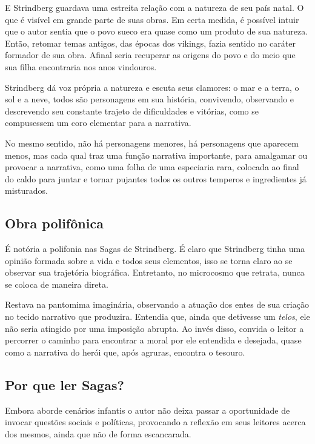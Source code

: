 \documentclass{extarticle}
\begin{document}
E Strindberg guardava uma estreita relação com a natureza de seu país
natal. O que é visível em grande parte de suas obras. Em certa medida, é
possível intuir que o autor sentia que o povo sueco era quase como um
produto de sua natureza. Então, retomar temas antigos, das épocas dos
vikings, fazia sentido no caráter formador de sua obra. Afinal seria
recuperar as origens do povo e do meio que sua filha encontraria nos
anos vindouros.

Strindberg dá voz própria a natureza e escuta seus clamores: o mar e a
terra, o sol e a neve, todos são personagens em sua história,
convivendo, observando e descrevendo seu constante trajeto de
dificuldades e vitórias, como se compusessem um coro elementar para a
narrativa.

No mesmo sentido, não há personagens menores, há personagens que
aparecem menos, mas cada qual traz uma função narrativa importante, para
amalgamar ou provocar a narrativa, como uma folha de uma especiaria
rara, colocada ao final do caldo para juntar e tornar pujantes todos os
outros temperos e ingredientes já misturados.

\subsection{Obra polifônica}

É notória a polifonia nas Sagas de Strindberg. É claro que Strindberg
tinha uma opinião formada sobre a vida e todos seus elementos, isso se
torna claro ao se observar sua trajetória biográfica. Entretanto, no
microcosmo que retrata, nunca se coloca de maneira direta.

Restava na pantomima imaginária, observando a atuação dos entes de sua
criação no tecido narrativo que produzira. Entendia que, ainda que
detivesse um \emph{telos}, ele não seria atingido por uma imposição
abrupta. Ao invés disso, convida o leitor a percorrer o caminho para
encontrar a moral por ele entendida e desejada, quase como a narrativa
do herói que, após agruras, encontra o tesouro.

\subsection{Por que ler Sagas?}

Embora aborde cenários infantis o autor não deixa passar a oportunidade
de invocar questões sociais e políticas, provocando a reflexão em seus
leitores acerca dos mesmos, ainda que não de forma escancarada.
\end{document}
